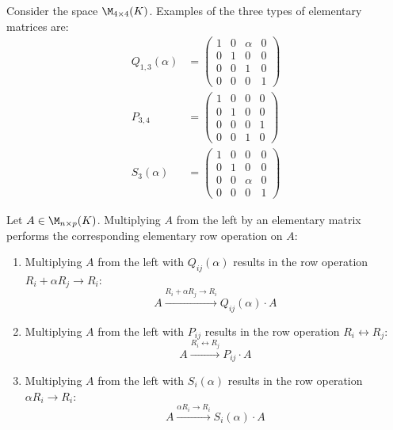 \begin{example}
Consider the space $\M_{4 \times 4}(K)$. Examples of the three types of elementary matrices are:
\begin{align*}
    Q_{1,3}(\alpha) &= \begin{pmatrix} 1 & 0 & \alpha & 0 \\ 0 & 1 & 0 & 0 \\ 0 & 0 & 1 & 0 \\ 0 & 0 & 0 & 1 \end{pmatrix} \\
    P_{3,4} &= \begin{pmatrix} 1 & 0 & 0 & 0 \\ 0 & 1 & 0 & 0 \\ 0 & 0 & 0 & 1 \\ 0 & 0 & 1 & 0 \end{pmatrix} \\
    S_3(\alpha) &= \begin{pmatrix} 1 & 0 & 0 & 0 \\ 0 & 1 & 0 & 0 \\ 0 & 0 & \alpha & 0 \\ 0 & 0 & 0 & 1 \end{pmatrix}
\end{align*}
\end{example}

\begin{lemma}
\label{lemma:row_operations_matrix_multiplication}
Let $A \in \M_{n \times p}(K)$. Multiplying $A$ from the left by an elementary matrix performs the corresponding elementary row operation on $A$:
\begin{enumerate}
    \item Multiplying $A$ from the left with $Q_{ij}(\alpha)$ results in the row operation $R_i + \alpha R_j \longrightarrow R_i$:
    \begin{equation*}
        A \xrightarrow{R_i + \alpha R_j \longrightarrow R_i} Q_{ij}(\alpha) \cdot A
    \end{equation*}
    \item Multiplying $A$ from the left with $P_{ij}$ results in the row operation $R_i \leftrightarrow R_j$:
    \begin{equation*}
        A \xrightarrow{R_i \leftrightarrow R_j} P_{ij} \cdot A
    \end{equation*}
    \item Multiplying $A$ from the left with $S_i(\alpha)$ results in the row operation $\alpha R_i \longrightarrow R_i$:
    \begin{equation*}
        A \xrightarrow{\alpha R_i \longrightarrow R_i} S_i(\alpha) \cdot A
    \end{equation*}
\end{enumerate}
\end{lemma}

